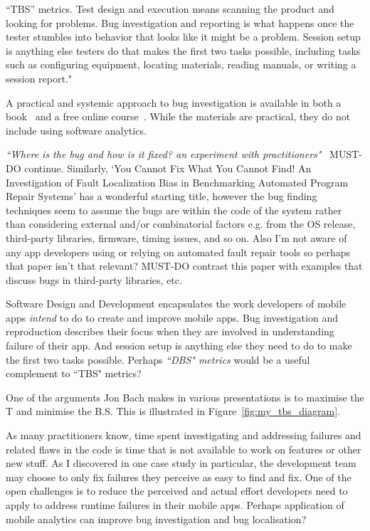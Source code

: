 “TBS” metrics. Test design and execution means scanning the product and looking for problems. Bug investigation and reporting is what happens once the tester stumbles into behavior that looks like it might be a problem. Session setup is anything else testers do that makes the first two tasks possible, including tasks such as configuring equipment, locating materials, reading manuals, or writing a session report."~\citep{bach2000_sbtm}

A practical and systemic approach to bug investigation is available in both a book~\citep{zeller2009_why_programs_fail} and a free online course~\citep{zeller2012_udacity_software_debugging_course}. While the materials are practical, they do not include using software analytics.

\emph{``Where is the bug and how is it fixed? an experiment with practitioners"}~\citep{bohme2017_where_is_the_bug_and_how_is_it_fixed} MUST-DO continue. Similarly, `You Cannot Fix What You Cannot Find! An Investigation of Fault Localization Bias in Benchmarking Automated Program Repair Systems' has a wonderful starting title, however the bug finding techniques seem to assume the bugs are within the code of the system rather than considering external and/or combinatorial factors e.g. from the OS release, third-party libraries, firmware, timing issues, and so on. Also I'm not aware of any app developers using or relying on automated fault repair tools so perhaps that paper isn't that relevant? MUST-DO contrast this paper with examples that discuss bugs in third-party libraries, etc.~\cite{linares2013_api_change_and_fault_proneness_android}

Software Design and Development encapsulates the work developers of mobile apps \emph{intend} to do to create and improve mobile apps. Bug investigation and reproduction describes their focus when they are involved in understanding failure of their app. And session setup is anything else they need to do to make the first two tasks possible. Perhaps \emph{``DBS" metrics} would be a useful complement to ``TBS" metrics?

One of the arguments Jon Bach makes in various presentations is to maximise the T and minimise the B.S. This is illustrated in Figure~\ref{fig:my_tbs_diagram}.


As many practitioners know, time spent investigating and addressing failures and related flaws in the code is time that is not available to work on features or other new stuff. As I discovered in one case study in particular, the development team may choose to only fix failures they perceive as easy to find and fix. One of the open challenges is to reduce the perceived and actual effort developers need to apply to address runtime failures in their mobile apps. 
%
Perhaps application of mobile analytics can improve bug investigation and bug localisation? 

